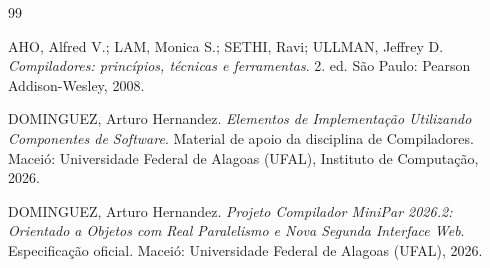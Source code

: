 \begin{thebibliography}{99}

AHO, Alfred V.; LAM, Monica S.; SETHI, Ravi; ULLMAN, Jeffrey D. \textit{Compiladores: princípios, técnicas e ferramentas}. 2. ed. São Paulo: Pearson Addison-Wesley, 2008.

DOMINGUEZ, Arturo Hernandez. \textit{Elementos de Implementação Utilizando Componentes de Software}. Material de apoio da disciplina de Compiladores. Maceió: Universidade Federal de Alagoas (UFAL), Instituto de Computação, 2026.

DOMINGUEZ, Arturo Hernandez. \textit{Projeto Compilador MiniPar 2026.2: Orientado a Objetos com Real Paralelismo e Nova Segunda Interface Web}. Especificação oficial. Maceió: Universidade Federal de Alagoas (UFAL), 2026.

\end{thebibliography}
